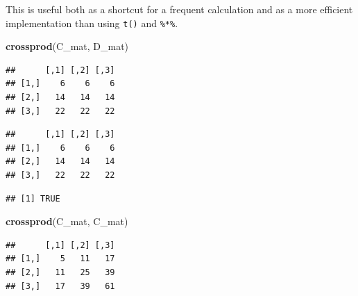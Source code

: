 \documentclass[]{book}
\newenvironment{Shaded}{\begin{snugshade}}{\end{snugshade}}
\newcommand{\KeywordTok}[1]{\textcolor[rgb]{0.13,0.29,0.53}{\textbf{#1}}}
\newcommand{\StringTok}[1]{\textcolor[rgb]{0.31,0.60,0.02}{#1}}
\newcommand{\OperatorTok}[1]{\textcolor[rgb]{0.81,0.36,0.00}{\textbf{#1}}}
\newcommand{\NormalTok}[1]{#1}
\theoremstyle{definition}
\theoremstyle{definition}
\theoremstyle{definition}
\theoremstyle{remark}
\begin{document}
This is useful both as a shortcut for a frequent calculation and as a
more efficient implementation than using \texttt{t()} and
\texttt{\%*\%}.

\begin{Shaded}
\begin{Highlighting}[]
\KeywordTok{crossprod}\NormalTok{(C_mat, D_mat)}
\end{Highlighting}
\end{Shaded}

\begin{verbatim}
##      [,1] [,2] [,3]
## [1,]    6    6    6
## [2,]   14   14   14
## [3,]   22   22   22
\end{verbatim}

\begin{Shaded}
\end{Shaded}

\begin{verbatim}
##      [,1] [,2] [,3]
## [1,]    6    6    6
## [2,]   14   14   14
## [3,]   22   22   22
\end{verbatim}

\begin{Shaded}
\end{Shaded}

\begin{verbatim}
## [1] TRUE
\end{verbatim}

\begin{Shaded}
\begin{Highlighting}[]
\KeywordTok{crossprod}\NormalTok{(C_mat, C_mat)}
\end{Highlighting}
\end{Shaded}

\begin{verbatim}
##      [,1] [,2] [,3]
## [1,]    5   11   17
## [2,]   11   25   39
## [3,]   17   39   61
\end{verbatim}

\begin{Shaded}
\end{Shaded}
\end{document}
